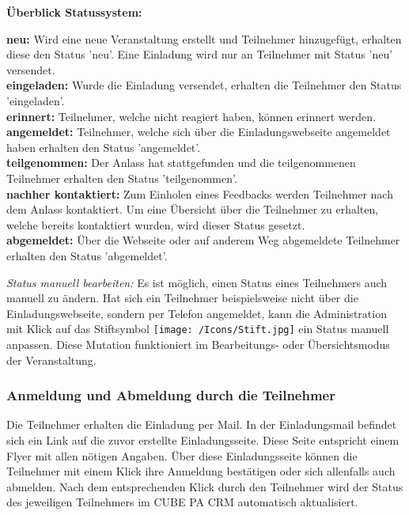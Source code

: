 \textbf{Überblick Statussystem:}

\textbf{neu:} Wird eine neue Veranstaltung erstellt und Teilnehmer hinzugefügt, erhalten diese den Status 'neu'. Eine Einladung wird nur an Teilnehmer mit Status 'neu' versendet.\\
\textbf{eingeladen:} Wurde die Einladung versendet, erhalten die Teilnehmer den Status 'eingeladen'.\\
\textbf{erinnert:} Teilnehmer, welche nicht reagiert haben, können erinnert werden.\\
\textbf{angemeldet:} Teilnehmer, welche sich über die Einladungswebseite angemeldet haben erhalten den Status 'angemeldet'.\\
\textbf{teilgenommen:} Der Anlass hat stattgefunden und die teilgenommenen Teilnehmer erhalten den Status 'teilgenommen'.\\
\textbf{nachher kontaktiert:} Zum Einholen eines Feedbacks werden Teilnehmer nach dem Anlass kontaktiert. Um eine Übersicht über die Teilnehmer zu erhalten, welche bereits kontaktiert wurden, wird dieser Status gesetzt.\\
\textbf{abgemeldet:} Über die Webseite oder auf anderem Weg abgemeldete Teilnehmer erhalten den Status 'abgemeldet'.\\

\vspace{\baselineskip}

\textit{Status manuell bearbeiten:} Es ist möglich, einen Status eines Teilnehmers auch manuell zu ändern. Hat sich ein Teilnehmer beispielsweise nicht über die Einladungswebseite, sondern per Telefon angemeldet, kann die Administration mit Klick auf das Stiftsymbol \texttt{[image: /Icons/Stift.jpg]} ein Status manuell anpassen. Diese Mutation funktioniert im Bearbeitungs- oder Übersichtsmodus der Veranstaltung.

\subsubsection{Anmeldung und Abmeldung durch die Teilnehmer}

Die Teilnehmer erhalten die Einladung per Mail. In der Einladungsmail befindet sich ein Link auf die zuvor erstellte Einladungsseite. Diese Seite entspricht einem Flyer mit allen nötigen Angaben. Über diese Einladungsseite können die Teilnehmer mit einem Klick ihre Anmeldung bestätigen oder sich allenfalls auch abmelden. Nach dem entsprechenden Klick durch den Teilnehmer wird der Status des jeweiligen Teilnehmers im CUBE PA CRM automatisch aktualisiert. 

